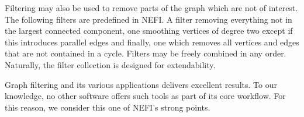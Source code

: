 		Filtering may also be used to remove parts of the graph which are not of interest. The following filters are predefined in NEFI. A filter removing everything not in the largest connected component, one smoothing vertices of degree two except if this introduces parallel edges and finally, one which removes all vertices and edges that are not contained in a cycle. Filters may be freely combined in any order. Naturally, the filter collection is designed for extendability.

		Graph filtering and its various applications delivers excellent results. To our knowledge, no other software offers such tools as part of its core workflow. For this reason, we consider this one of NEFI's strong points.









